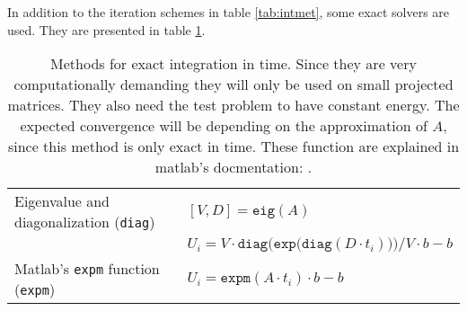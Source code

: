 \noindent In addition to the iteration schemes in table \ref{tab:intmet}, some exact solvers are used. They are presented in table \ref{tab:intcorrect}.
\begin{table}

\caption{Methods for exact integration in time. Since they are very computationally demanding they will only be used on small projected matrices. They also need the test problem to have constant energy. The expected convergence will be depending on the approximation of $A$, since this method is only exact in time. These function are explained in matlab's docmentation: \cite{expm}. }

\begin{tabular}{l l}
Eigenvalue and diagonalization (\texttt{diag}) & $[V,D] = \texttt{eig}(A)$ \\
 & $U_i = V \cdot \texttt{diag} \Big( \texttt{exp} \big( \texttt{diag}(D \cdot t_i)\big)\Big)/V \cdot b - b$ \\
Matlab's \texttt{expm} function (\texttt{expm}) & $U_i = \texttt{expm}(A \cdot t_i) \cdot b - b$ \\

\end{tabular}

\label{tab:intcorrect} 
\end{table}

